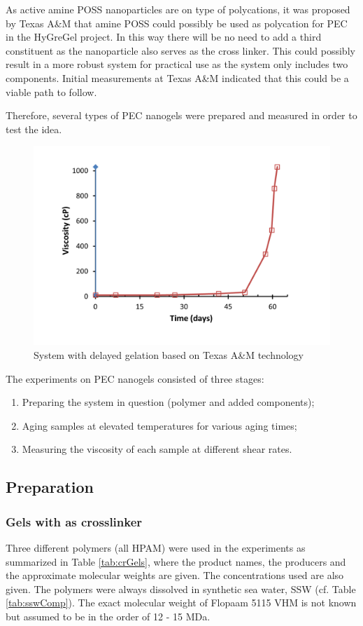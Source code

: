 As active amine POSS  nanoparticles are on type of polycations, it was proposed by Texas A\&M that amine POSS could possibly be used as polycation for PEC in the HyGreGel project. In this way there will be no need to add a third constituent as the nanoparticle also serves as the cross linker. This could possibly result in a more robust system for practical use as the system only includes two components. Initial measurements at Texas A\&M indicated that this could be a viable path to follow.

Therefore, several types of PEC nanogels were prepared and measured in order to test the idea.

\begin{figure}
    \centering
    \includegraphics[width=.75\textwidth]{img/cht/jennTai.png}
    \caption{System with delayed gelation based on Texas A\&M technology \citep{Cordova2008}}
    \label{cht:jennTai}
\end{figure}

\newpage
The experiments on PEC nanogels consisted of three stages:
\begin{enumerate}
    \item Preparing the system in question (polymer and added components);
    \item Aging samples at elevated temperatures for various aging times;
    \item Measuring the viscosity of each sample at different shear rates.
\end{enumerate}

\subsection{Preparation}

\subsubsection{Gels with  as crosslinker}
 Three different polymers (all HPAM) were used in the experiments as summarized in Table \ref{tab:crGels}, where the product names, the producers and the approximate molecular weights are given. The concentrations used are also given. The polymers were always dissolved in synthetic sea water, SSW (cf. Table \ref{tab:sswComp}). The exact molecular weight of Flopaam 5115 VHM is not known but assumed to be in the order of 12 - 15 MDa.

